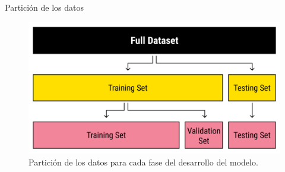 \begin{frame}{Partición de los datos}
	\begin{figure}
		\centering
	    \includegraphics[width=\linewidth]{./img/particion.png}
    		\caption{Partición de los datos para cada fase del desarrollo del modelo.}
	\end{figure}

\end{frame}




